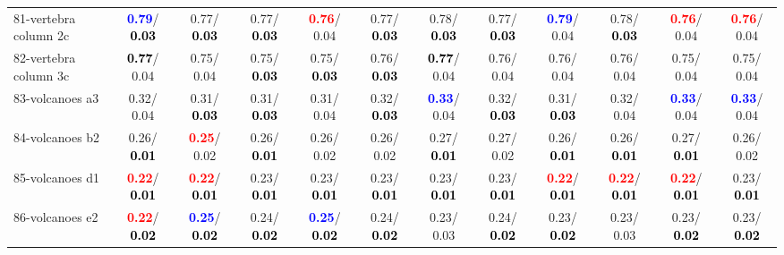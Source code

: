 \begin{table}[h]
\begin{center}
{\begin{tabular}{lc|c|c|c|c|c|c|c|c|c|c}
81-vertebra column 2c & \textcolor{blue}{\textbf{  0.79}}/\textcolor{black}{\textbf{  0.03}} &   0.77/\textcolor{black}{\textbf{  0.03}} &   0.77/\textcolor{black}{\textbf{  0.03}} & \textcolor{red}{\textbf{  0.76}}/  0.04 &   0.77/\textcolor{black}{\textbf{  0.03}} &   0.78/\textcolor{black}{\textbf{  0.03}} &   0.77/\textcolor{black}{\textbf{  0.03}} & \textcolor{blue}{\textbf{  0.79}}/  0.04 &   0.78/\textcolor{black}{\textbf{  0.03}} & \textcolor{red}{\textbf{  0.76}}/  0.04 & \textcolor{red}{\textbf{  0.76}}/  0.04 \\
82-vertebra column 3c & \textcolor{black}{\textbf{  0.77}}/  0.04 &   0.75/  0.04 &   0.75/\textcolor{black}{\textbf{  0.03}} &   0.75/\textcolor{black}{\textbf{  0.03}} &   0.76/\textcolor{black}{\textbf{  0.03}} & \textcolor{black}{\textbf{  0.77}}/  0.04 &   0.76/  0.04 &   0.76/  0.04 &   0.76/  0.04 &   0.75/  0.04 &   0.75/  0.04 \\
83-volcanoes a3 &   0.32/  0.04 &   0.31/\textcolor{black}{\textbf{  0.03}} &   0.31/\textcolor{black}{\textbf{  0.03}} &   0.31/  0.04 &   0.32/\textcolor{black}{\textbf{  0.03}} & \textcolor{blue}{\textbf{  0.33}}/  0.04 &   0.32/\textcolor{black}{\textbf{  0.03}} &   0.31/\textcolor{black}{\textbf{  0.03}} &   0.32/  0.04 & \textcolor{blue}{\textbf{  0.33}}/  0.04 & \textcolor{blue}{\textbf{  0.33}}/  0.04 \\
84-volcanoes b2 &   0.26/\textcolor{black}{\textbf{  0.01}} & \textcolor{red}{\textbf{  0.25}}/  0.02 &   0.26/\textcolor{black}{\textbf{  0.01}} &   0.26/  0.02 &   0.26/  0.02 &   0.27/\textcolor{black}{\textbf{  0.01}} &   0.27/  0.02 &   0.26/\textcolor{black}{\textbf{  0.01}} &   0.26/\textcolor{black}{\textbf{  0.01}} &   0.27/\textcolor{black}{\textbf{  0.01}} &   0.26/  0.02 \\
85-volcanoes d1 & \textcolor{red}{\textbf{  0.22}}/\textcolor{black}{\textbf{  0.01}} & \textcolor{red}{\textbf{  0.22}}/\textcolor{black}{\textbf{  0.01}} &   0.23/\textcolor{black}{\textbf{  0.01}} &   0.23/\textcolor{black}{\textbf{  0.01}} &   0.23/\textcolor{black}{\textbf{  0.01}} &   0.23/\textcolor{black}{\textbf{  0.01}} &   0.23/\textcolor{black}{\textbf{  0.01}} & \textcolor{red}{\textbf{  0.22}}/\textcolor{black}{\textbf{  0.01}} & \textcolor{red}{\textbf{  0.22}}/\textcolor{black}{\textbf{  0.01}} & \textcolor{red}{\textbf{  0.22}}/\textcolor{black}{\textbf{  0.01}} &   0.23/\textcolor{black}{\textbf{  0.01}} \\ \hline
86-volcanoes e2 & \textcolor{red}{\textbf{  0.22}}/\textcolor{black}{\textbf{  0.02}} & \textcolor{blue}{\textbf{  0.25}}/\textcolor{black}{\textbf{  0.02}} &   0.24/\textcolor{black}{\textbf{  0.02}} & \textcolor{blue}{\textbf{  0.25}}/\textcolor{black}{\textbf{  0.02}} &   0.24/\textcolor{black}{\textbf{  0.02}} &   0.23/  0.03 &   0.24/\textcolor{black}{\textbf{  0.02}} &   0.23/\textcolor{black}{\textbf{  0.02}} &   0.23/  0.03 &   0.23/\textcolor{black}{\textbf{  0.02}} &   0.23/\textcolor{black}{\textbf{  0.02}} \\

\end{tabular}}
\end{center}
\end{table}
